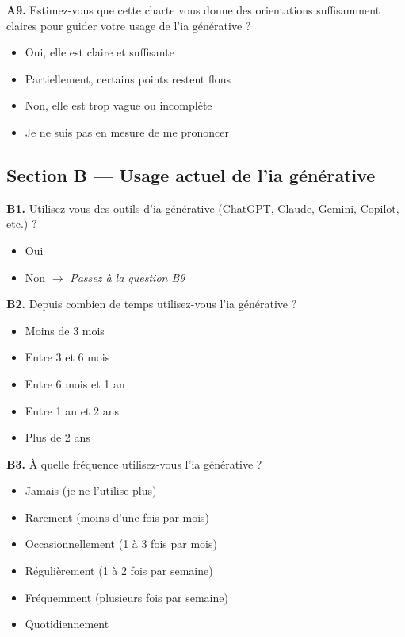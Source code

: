\textbf{A9.} Estimez-vous que cette charte vous donne
des orientations suffisamment claires pour guider votre
usage de l'\gls{ia} générative ?
\begin{itemize}[label=$\square$, leftmargin=1.5cm]
  \item Oui, elle est claire et suffisante
  \item Partiellement, certains points restent flous
  \item Non, elle est trop vague ou incomplète
  \item Je ne suis pas en mesure de me prononcer
\end{itemize}

\medskip

\subsection{Section B — Usage actuel de l'\gls{ia} générative}

\textbf{B1.} Utilisez-vous des outils d'\gls{ia} générative (ChatGPT, Claude, Gemini, Copilot, etc.) ?
\begin{itemize}[label=$\square$, leftmargin=1.5cm]
  \item Oui
  \item Non $\rightarrow$ \textit{Passez à la question B9}
\end{itemize}

\textbf{B2.} Depuis combien de temps utilisez-vous l'\gls{ia} générative ?
\begin{itemize}[label=$\square$, leftmargin=1.5cm]
  \item Moins de 3 mois
  \item Entre 3 et 6 mois
  \item Entre 6 mois et 1 an
  \item Entre 1 an et 2 ans
  \item Plus de 2 ans
\end{itemize}

\textbf{B3.} À quelle fréquence utilisez-vous l'\gls{ia} générative ?
\begin{itemize}[label=$\square$, leftmargin=1.5cm]
  \item Jamais (je ne l'utilise plus)
  \item Rarement (moins d'une fois par mois)
  \item Occasionnellement (1 à 3 fois par mois)
  \item Régulièrement (1 à 2 fois par semaine)
  \item Fréquemment (plusieurs fois par semaine)
  \item Quotidiennement
\end{itemize}

